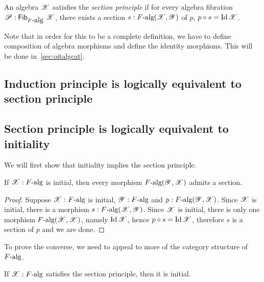\documentclass[a4paper,10pt]{article}
\begin{document}
\begin{defn}
  An algebra $\mathscr{X}$ satisfies the \emph{section principle} if for
  every algebra fibration
  $\mathscr{P} : \mathsf{Fib}_{F\mbox{-alg}}\ \mathscr{X}$, there exists a section
  $s : F\mbox{-alg}(\mathscr{X},\mathscr{Y})$ of $p$, \ie
  $p \circ s = \operatorname*{Id}{\mathscr{X}}$.
\end{defn}

Note that in order for this to be a complete definition, we have to
define composition of algebra morphisms and define the identity
morphisms. This will be done in~\cref{sec:oitalgcat}.

\subsection{Induction principle is logically equivalent to section principle}
\label{sec:oitsectioninduction}


\subsection{Section principle is logically equivalent to initiality}
\label{sec:oitsectioninitiality}

We will first show that initiality implies the section principle.

\begin{prop}
  If $\mathscr{X} : F\mbox{-alg}$ is initial, then every morphism
  $F\mbox{-alg}(\mathscr{Y},\mathscr{X})$ admits a section.
\end{prop}

\begin{proof}
  Suppose $\mathscr{X} : F\mbox{-alg}$ is initial, $\mathscr{Y} : F\mbox{-alg}$
  and $p : F\mbox{-alg}(\mathscr{Y},\mathscr{X})$. Since $\mathscr{X}$ is initial,
  there is a morphism $s : F\mbox{-alg}(\mathscr{X},\mathscr{Y})$. Since
  $\mathscr{X}$ is initial, there is only one morphism
  $F\mbox{-alg}(\mathscr{X},\mathscr{X})$, namely $\operatorname*{Id}{\mathscr{X}}$, hence
  $p \circ s = \operatorname*{Id}{\mathscr{X}}$, therefore $s$ is a section of $p$ and we
  are done.
\end{proof}

To prove the converse, we need to appeal to more of the category
structure of $F\mbox{-alg}$.

\begin{prop}
  If $\mathscr{X} : F\mbox{-alg}$ satisfies the section principle, then it
  is initial.
\end{prop}
\end{document}
